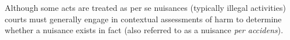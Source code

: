 Although some acts are treated as per se nuisances (typically illegal
activities) courts must generally engage in contextual assessments of harm to
determine whether a nuisance exists in fact (also referred to as a nuisance
\textit{per accidens}).

